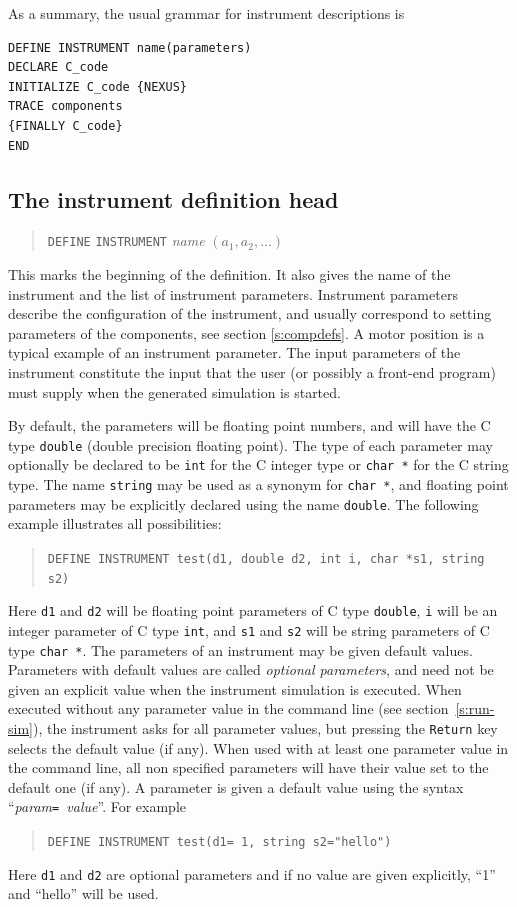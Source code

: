 As a summary, the usual grammar for instrument descriptions is
\begin{verbatim}
DEFINE INSTRUMENT name(parameters)
DECLARE C_code
INITIALIZE C_code {NEXUS}
TRACE components
{FINALLY C_code}
END
\end{verbatim}


\subsection{The instrument definition head}

\begin{quote}
  \texttt{DEFINE} \texttt{INSTRUMENT} \textit{name} $(a_1, a_2, \ldots)$
\end{quote} 
This marks the beginning of the definition. It also gives the name of
the instrument and the list of instrument parameters. Instrument
parameters describe the configuration of the instrument, and usually
correspond to setting parameters of the components, see section \ref{s:compdefs}. A motor position is
a typical example of an instrument parameter. The input parameters of
the instrument constitute the input that the user (or possibly a
front-end program) must supply when the
generated simulation is started.

By default, the parameters will be floating point numbers, and will have
the C type \verb+double+ (double precision floating point). The type of
each parameter may optionally be declared to be \verb+int+ for the C
integer type or \verb+char *+ for the C string type. 
The name \verb+string+ may be used as a synonym for \verb+char *+, and floating
point parameters may be explicitly declared using the name
\verb+double+. The following example illustrates all possibilities:
\begin{quote}
  \texttt{DEFINE INSTRUMENT test(d1, double d2, int i, char *s1, string s2)}
\end{quote}
Here \verb+d1+ and \verb+d2+ will be floating point parameters of C type
\verb+double+, \verb+i+ will be an integer parameter of C type
\verb+int+, and \verb+s1+ and \verb+s2+ will be string parameters of C
type \verb+char *+.
The parameters of an instrument may be given default values. Parameters with default values are called \emph{optional
  parameters}, and need not be given an explicit value when the
instrument simulation is executed. When executed without any parameter value in the command line (see section~\ref{s:run-sim}), the instrument asks for all parameter values, but pressing the \verb+Return+ key selects the default value (if any). When used with at least one parameter value in the command line, all non specified parameters will have their value set to the default one (if any). A parameter is given a
default value using the syntax ``\textit{param}\texttt{= }\textit{value}''.
For example
\begin{quote}
  \texttt{DEFINE INSTRUMENT test(d1= 1, string s2="hello")}
\end{quote}
Here \verb+d1+ and \verb+d2+ are optional parameters and if no
value are given explicitly, ``1'' and ``hello'' will be used.

